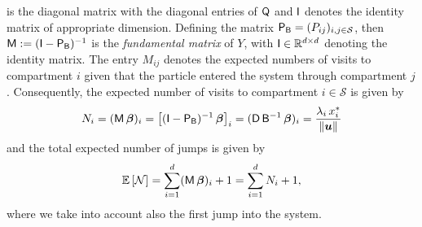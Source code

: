 \documentclass[smallextended]{svjour3}
\newcommand{\R}{\mathbb{R}}
\newcommand{\E}{\mathbb{E}}
\newcommand{\suml}{\sum\limits}
\newcommand{\vnorms}[1]{\|#1\|}
\begin{document}
is the diagonal matrix with the diagonal entries of $\mathsf{Q}$ and $\mathsf{I}$ denotes the identity matrix of appropriate dimension.
Defining the matrix $\mathsf{P}_{\mathsf{B}} = (P_{ij})_{i,j\in\mathcal{S}}$, then $\mathsf{M}:=(\mathsf{I}-\mathsf{P}_{\mathsf{B}})^{-1}$ is the \emph{fundamental matrix} of $Y$, with $\tens{I}\in\R^{d\times d}$ denoting the identity matrix.
The entry $M_{ij}$ denotes the expected numbers of visits to compartment $i$ given that the particle entered the system through compartment $j$.
Consequently, the expected number of visits to compartment $i\in\mathcal{S}$ is given by 
\begin{equation}
  \label{eqn:N_i}
  N_i = (\tens{M}\,\vec{\beta})_i = \left[(\tens{I}-\tens{P}_{\tens{B}})^{-1}\,\vec{\beta}\right]_i 
  = (\tens{D}\,\tens{B}^{-1}\,\vec{\beta})_i
  = \frac{\lambda_i\,x^\ast_i}{\vnorms{\vec{u}}}
\end{equation}
and the total expected number of jumps is given by
\begin{equation*}
  \E\left[\mathcal{N}\right] = \suml_{i=1}^d (\tens{M}\,\vec{\beta})_i+1= \suml_{i=1}^d N_i+1,
\end{equation*}
where we take into account also the first jump into the system.
\end{document}
